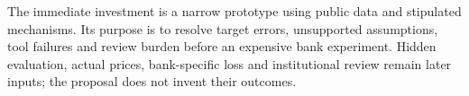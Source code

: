 The immediate investment is a narrow prototype using public data and
stipulated mechanisms. Its purpose is to resolve target errors,
unsupported assumptions, tool failures and review burden before an
expensive bank experiment. Hidden evaluation, actual prices,
bank-specific loss and institutional review remain later inputs; the
proposal does not invent their outcomes.

\label{exec14:cost-development-end}
